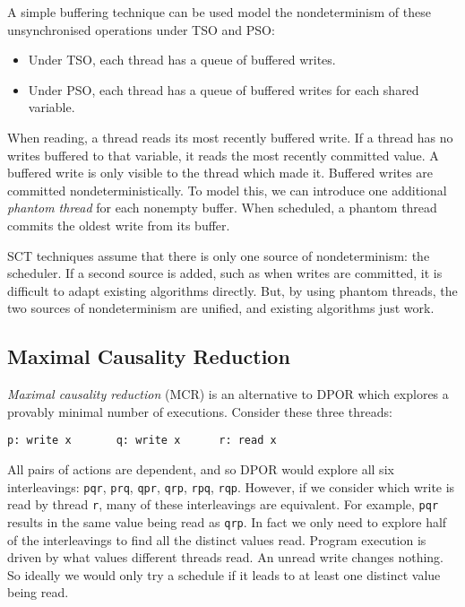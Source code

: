 A simple buffering technique can be used model the nondeterminism of
these unsynchronised operations under TSO and PSO\cite{zhang2015}:

\begin{itemize}
\item Under TSO, each thread has a queue of buffered writes.
\item Under PSO, each thread has a queue of buffered writes for each shared
variable.
\end{itemize}

When reading, a thread reads its most recently buffered write.  If a
thread has no writes buffered to that variable, it reads the most
recently committed value.  A buffered write is only visible to the
thread which made it.  Buffered writes are committed
nondeterministically.  To model this, we can introduce one additional
\emph{phantom thread} for each nonempty buffer.  When scheduled, a
phantom thread commits the oldest write from its buffer.

SCT techniques assume that there is only one source of nondeterminism:
the scheduler.  If a second source is added, such as when writes are
committed, it is difficult to adapt existing algorithms directly.
But, by using phantom threads, the two sources of nondeterminism are
unified, and existing algorithms just work\cite{zhang2015}.

\subsection{Maximal Causality Reduction}

\emph{Maximal causality reduction} (MCR)\cite{huang2015,huang2017} is
an alternative to DPOR which explores a provably minimal number of
executions.  Consider these three threads:

\begin{center}
\verb|p: write x       q: write x      r: read x|
\end{center}

All pairs of actions are dependent, and so DPOR would explore all six
interleavings: \texttt{pqr}, \texttt{prq}, \texttt{qpr}, \texttt{qrp},
\texttt{rpq}, \texttt{rqp}.  However, if we consider which write is
read by thread \texttt{r}, many of these interleavings are equivalent.
For example, \texttt{pqr} results in the same value being read as
\texttt{qrp}.  In fact we only need to explore half of the
interleavings to find all the distinct values read.  Program execution
is driven by what values different threads read.  An unread write
changes nothing.  So ideally we would only try a schedule if it leads
to at least one distinct value being read.

